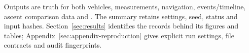 Outputs are truth for both vehicles, measurements, navigation, events/timeline, ascent comparison data and . The summary retains settings, seed, status and input hashes. Section~\ref{sec:results} identifies the records behind its figures and tables; Appendix~\ref{sec:appendix-reproduction} gives explicit run settings, file contracts and audit fingerprints.
